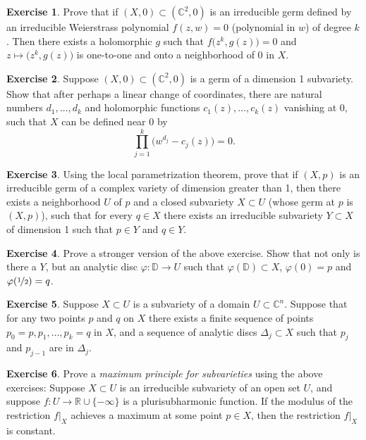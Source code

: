 \documentclass[12pt,openany]{book}
\newcommand{\C}{{\mathbb{C}}}
\newcommand{\R}{{\mathbb{R}}}
\newcommand{\D}{{\mathbb{D}}}
\theoremstyle{plain}
\theoremstyle{remark}
\theoremstyle{definition}
\newenvironment{exbox}{%
    \def\FrameCommand{\vrule width 1pt \relax\hspace {10pt}}%
    \MakeFramed {\advance \hsize -\width \FrameRestore }%
}{%
    \endMakeFramed
}
\theoremstyle{exercise}
\newtheorem{exercise}{Exercise}[section]
\theoremstyle{example}
\begin{document}
\begin{exbox}
\begin{exercise}
Prove that if $(X,0) \subset (\C^2,0)$ is an irreducible germ defined
by an irreducible Weierstrass polynomial $f(z,w) = 0$ (polynomial in $w$)
of degree $k$.  Then there exists a holomorphic $g$ such that
$f\bigl(z^k,g(z)\bigr) = 0$ and $z \mapsto \bigl(z^k,g(z)\bigr)$
is one-to-one and onto a neighborhood of 0 in $X$.
\end{exercise}

\begin{exercise}
Suppose $(X,0) \subset (\C^2,0)$ is a germ of a dimension 1 subvariety.
Show that after perhaps a linear change of coordinates,
there are natural numbers
$d_1,\ldots,d_k$
and
holomorphic functions $c_1(z),\ldots,c_k(z)$ vanishing at $0$,
such that $X$ can be defined near 0 by
\begin{equation*}
\prod_{j=1}^k {\bigl( w^{d_j} - c_j(z) \bigr)} = 0.
\end{equation*}
\end{exercise}

\begin{exercise}
Using the local parametrization theorem, prove that
if $(X,p)$ is an irreducible germ of a complex variety of dimension greater
than 1, then there exists a neighborhood $U$ of $p$ and a closed subvariety
$X \subset U$ (whose germ at $p$ is $(X,p)$), such that for every
$q \in X$ there exists an irreducible subvariety $Y \subset X$
of dimension 1 such that $p \in Y$ and $q \in Y$.
\end{exercise}

\begin{exercise}
Prove a stronger version of the above exercise.  Show that not only is there
a $Y$, but an analytic disc $\varphi \colon \D \to U$ such that
$\varphi(\D) \subset X$, $\varphi(0) = p$ and $\varphi(\nicefrac{1}{2}) =
q$.
\end{exercise}

\begin{exercise}
Suppose $X \subset U$ is a subvariety of a domain $U \subset \C^n$.
Suppose that for any two points $p$ and $q$ on $X$ there exists a finite sequence
of points $p_0 = p, p_1, \ldots, p_k = q$ in $X$, and a sequence of analytic discs
$\Delta_j \subset X$ such that $p_{j}$ and $p_{j-1}$ are in $\Delta_j$.
\end{exercise}

\begin{exercise}\label{exercise:maxprincsubvar}
Prove a \emph{maximum principle for subvarieties} using the above exercises:
Suppose $X \subset U$ is an irreducible subvariety of an open set $U$,
and suppose $f \colon U \to \R \cup \{ - \infty \}$
is a plurisubharmonic function.  If the modulus of the restriction $f|_X$
achieves a maximum
at some point $p \in X$, then the restriction $f|_X$ is constant.
\end{exercise}


\end{exbox}
\end{document}
